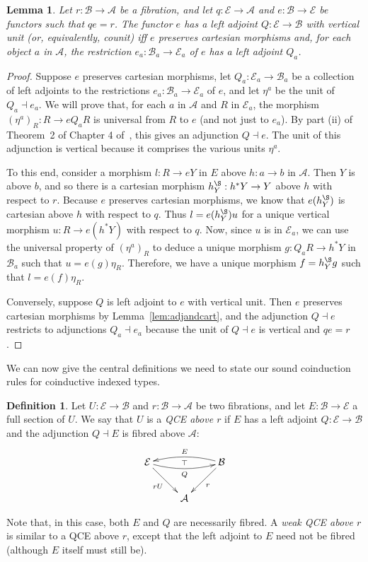 \documentclass{LMCS}
\newcommand{\ra}{\rightarrow}
\newcommand\E{{\mathcal E}}
\newcommand\B{{\mathcal B}}
\newcommand\A{{\mathcal A}}
\theoremstyle{plain}
\newtheorem{lemma}[theorem]{Lemma}
\theoremstyle{remark}
\theoremstyle{definition}
\newtheorem{definition}[theorem]{Definition}
\begin{document}
\begin{lemma}\label{lem:weakfibadj}
  Let $r:\B\to\A$ be a fibration, and let $q:\E\to\A$ and $e:\B\to\E$
  be functors such that $qe = r$. The functor $e$ has a left adjoint
  $Q:\E\to\B$ with vertical unit (or, equivalently, counit) iff $e$
  preserves cartesian morphisms and, for each object $a$ in $\A$, the
  restriction $e_a:\B_a\to\E_a$ of $e$ has a left adjoint $Q_a$.
\end{lemma}
\begin{proof}
  Suppose $e$ preserves cartesian morphisms, let $Q_a:\E_a\to\B_a$ be
  a collection of left adjoints to the restrictions $e_a:\B_a\to\E_a$
  of $e$, and let $\eta^a$ be the unit of $Q_a \dashv e_a$.  We will
  prove that, for each $a$ in $\A$ and $R$ in $\E_a$, the morphism
  $(\eta^a)_R:R\to eQ_a R$ is universal from $R$ to $e$ (and not just to
  $e_a$). By part (ii) of Theorem~2 of Chapter 4 of~\cite{mac71}, this
  gives an adjunction $Q \dashv e$. The unit of this adjunction is
  vertical because it comprises the various units $\eta^a$.

  To this end, consider a morphism $l:R\to e Y$ in $E$ above $h:a\to
  b$ in $\A$.  Then $Y$ is above $b$, and so there is a cartesian
  morphism $h^\S_Y:h^*Y \ra Y$ above $h$ with respect to $r$. Because
  $e$ preserves cartesian morphisms, we know that $e(h^\S_Y)$ is
  cartesian above $h$ with respect to $q$. Thus $l = e(h^\S_Y) u$ for
  a unique vertical morphism $u:R\to e(h^*Y)$ with respect to
  $q$. Now, since $u$ is in $\E_a$, we can use the universal property
  of $(\eta^a)_R$ to deduce a unique morphism $g:Q_aR\to h^*Y$ in $\B_a$
  such that $u = e(g)\eta_R$. Therefore, we have a unique morphism
  $f=h^\S_Y g$ such that $l = e(f) \eta_R$.

  Conversely, suppose $Q$ is left adjoint to $e$ with vertical unit.
  Then $e$ preserves cartesian morphisms by
  Lemma~\ref{lem:adjandcart}, and the adjunction $Q \dashv e$
  restricts to adjunctions $Q_a \dashv e_a$ because the unit of $Q
  \dashv e$ is vertical and $qe = r$.
\end{proof}

We can now give the central definitions we need to state our sound
coinduction rules for coinductive indexed types.

\begin{definition}\label{def:qcea}
  Let $U:\E\to\B$ and $r:\B\to\A$ be two fibrations, and let
  $E:\B\to\E$ a full section of $U$. We say that $U$ is a \emph{QCE
    above $r$} if $E$ has a left adjoint $Q:\E\to\B$ and the
  adjunction $Q \dashv E$ is fibred above $\A$:
  \[\xymatrix{\E\ar[dr]_{r U} \ar@/_/[rr]_Q
    \ar@{}[rr]|\top & & \ar@/_/[ll]_E \ar[ld]^r \B\\ & \A & }\] 

\vspace*{0.1in}

\noindent
Note that, in this case, both $E$ and $Q$ are necessarily fibred.  A
{\em weak QCE above $r$} is similar to a QCE above $r$, except that
the left adjoint to $E$ need not be fibred (although $E$ itself must
still be).
\end{definition}
\noindent
\end{document}
